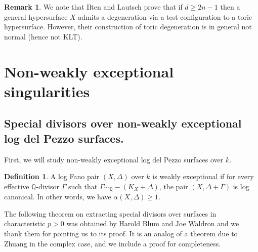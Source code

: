 \documentclass[11pt,reqno]{amsart}
\newcommand{\Q}{\mathbb{Q}}
\numberwithin{equation}{section}
\theoremstyle{definition}
\newtheorem{rem}[prop] {Remark}
\newtheorem{defi}[prop] {Definition}
\begin{document}
\begin{rem}
We note that Ilten and Lautsch \cite{IL22} prove that if $d\geq 2n-1$ then a general hypersurface $X$ admits a degeneration via a test configuration to a toric hypersurface. However, their construction of toric degeneration is in general not normal (hence not KLT).
\end{rem}

\section{Non-weakly exceptional singularities}
\label{section:Fregularity}


\subsection{Special divisors over non-weakly exceptional log del Pezzo surfaces.}

First, we will study non-weakly exceptional log del Pezzo surfaces over $k$.

\begin{defi} \label{dfn:weaklyexcepFano}
        A log Fano pair $(X, \Delta)$ over $k$ is weakly exceptional if for every effective $\Q$-divisor $\Gamma$ such that $\Gamma \sim _\Q -(K_X + \Delta)$, the pair $(X, \Delta+ \Gamma)$ is log canonical. In other words, we have $\alpha(X,\Delta) \geq 1$.
\end{defi}

The following theorem on extracting special divisors over surfaces in characteristic $p>0$ was obtained by Harold Blum and Joe Waldron and we thank them for pointing us to its proof. It is an analog of a theorem due to Zhuang in the complex case, and we include a proof for completeness.
\end{document}
